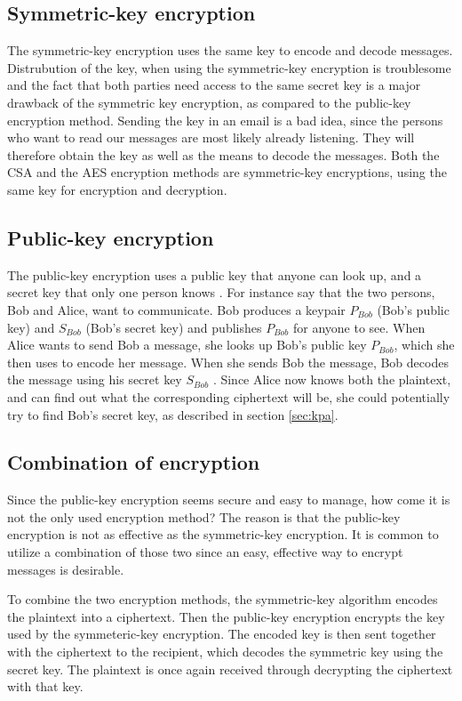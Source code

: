 \subsection{Symmetric-key encryption}\label{ch:symmetric}
The symmetric-key encryption uses the same key to encode and decode 
messages. Distrubution of the key, when using the symmetric-key 
encryption is troublesome and the fact that both parties need access to 
the same secret key is a major drawback of the symmetric key 
encryption, as compared to the public-key encryption method. Sending 
the key in an email is a bad idea, since the persons who want to read 
our messages are most likely already listening. They will therefore 
obtain the key as well as the means to decode the messages. Both the 
CSA and the AES encryption methods are symmetric-key encryptions, using 
the same key for encryption and decryption.
\subsection{Public-key encryption}\label{ch:public}
The public-key encryption uses a public key that anyone can look up, 
and a secret key that only one person knows 
\citep[pp. 25--32]{Simmons:1992}. For instance say that the two 
persons, Bob and Alice, want to communicate. Bob produces a keypair 
\(P_{Bob}\) (Bob’s public key) and \(S_{Bob}\) (Bob’s secret key) and 
publishes \(P_{Bob}\) for anyone to see. When Alice wants to send Bob a 
message, she looks up Bob’s public key \(P_{Bob}\), which she then uses 
to encode her message. When she sends Bob the message, Bob decodes the 
message using his secret key \(S_{Bob}\) \citep{Schneier:2003}. 
Since Alice now knows both the plaintext, and can find out what the 
corresponding ciphertext will be, she could potentially try to find 
Bob's secret key, as described in section \ref{sec:kpa}.

\subsection{Combination of encryption}
Since the public-key encryption seems secure and easy to manage, how 
come it is not the only used encryption method? The reason is that the 
public-key encryption is not as effective as the symmetric-key 
encryption. It is common to utilize a combination of those two since an 
easy, effective way to encrypt messages is desirable.

To combine the two encryption methods, the symmetric-key algorithm 
encodes the plaintext into a ciphertext. Then the public-key encryption 
encrypts the key used by the symmeteric-key encryption. The encoded key 
is then sent together with the ciphertext to the recipient, which 
decodes the symmetric key using the secret key. The plaintext is once 
again received through decrypting the ciphertext with that key.


